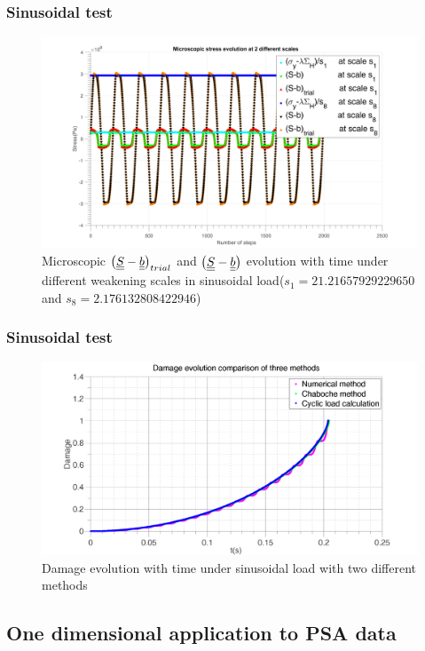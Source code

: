 \documentclass[xcolor=table]{Bredelebeamer}
\begin{document}
\begin{frame}
	\frametitle{Sinusoidal test}
\begin{figure}[!h]
	\centering
	\includegraphics[width=\textwidth]{figures//trialsin.png} 
	\caption{Microscopic $\left( \uline{\uline{S}}-\uline{\uline{b}}\right)_{trial}$ and $\left( \uline{\uline{S}}-\uline{\uline{b}}\right)$ evolution with time under different weakening scales in sinusoidal load($s_1=21.21657929229650$ and $s_8=2.176132808422946$)}
	\label{trialsin}
\end{figure}
\end{frame}	
\begin{frame}
	\frametitle{Sinusoidal test}
\begin{figure}[!h]
	\centering
	\includegraphics[width=\textwidth]{figures//damagesin.png} 
	\caption{Damage evolution with time under sinusoidal load with two different methods}
	\label{damsin}
\end{figure}
\end{frame}	

\subsection{One dimensional application to PSA data}
\end{document}
